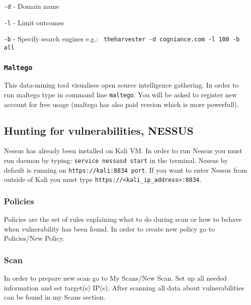 \documentclass{article}[12pt]
\begin{document}
\texttt{-d} - Domain name
\newline

\texttt{-l} - Limit outcomes
\newline

\texttt{-b} - Specify search engines e.g.: \texttt{ theharvester -d cogniance.com -l 100 -b all }


\subsubsection{\texttt{Maltego}}
This data-mining tool visualises open source intelligence gathering.
In order to run maltego type in command line \texttt{maltego}.
You will be asked to register new account for free usage (maltego has also paid version
which is more powerfull).

\subsubsection*{\texttt{}}

\subsection{Hunting for vulnerabilities, NESSUS}

Nessus has already been installed on Kali VM. In order to run Nessus you must run daemon by typing: \texttt{service nessusd start} in the terminal.
Nessus by default is running on \texttt{https://kali:8834 port}.
If you want to enter Nessus from outside of Kali you must type \texttt{https://<kali\_ip\_address>:8834}.

\subsubsection{Policies}

Policies are the set of rules explaining what to do during scan or how to behave when vulnerability has been found.
In order to create new policy go to Policies/New Policy.

\subsubsection{Scan}

In order to prepare new scan go to My Scans/New Scan.
Set up all needed information and set target(s) IP(s).
After scanning all data about vulnerabilities can be found in my Scans section.
\end{document}
